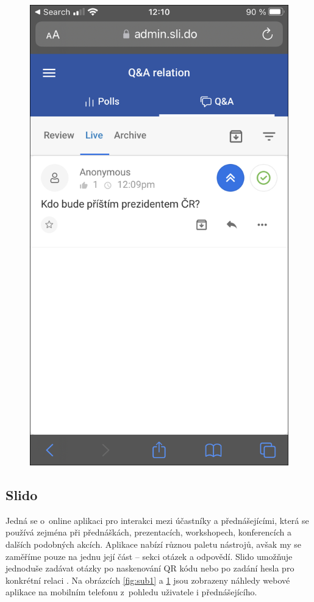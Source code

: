 \begin{figure}[h]
\begin{minipage}{.5\textwidth}
  \includegraphics[width=.9\linewidth]{obrazky/slido_admin.png}
  \label{fig:sub2}
\end{minipage}
\end{figure}

\subsection{Slido}
Jedná se o~online aplikaci pro interakci mezi účastníky a přednášejícími, která se používá zejména při přednáškách, prezentacích, workshopech, konferencích a dalších podobných akcích. Aplikace nabízí různou paletu nástrojů, avšak my se zaměříme pouze na jednu její část -- sekci otázek a odpovědí. Slido umožňuje jednoduše zadávat otázky po naskenování QR kódu nebo po zadání hesla pro konkrétní relaci \cite{slidosection}. Na obrázcích \ref{fig:sub1} a \ref{fig:sub2} jsou zobrazeny náhledy webové aplikace na mobilním telefonu z~pohledu uživatele i přednášejícího.

